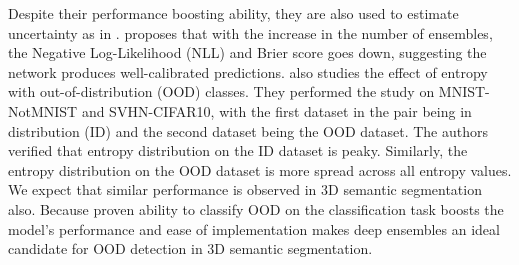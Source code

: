 Despite their performance boosting ability, they are also used to estimate uncertainty as in \cite{lakshminarayanan2016simple}.
\cite{lakshminarayanan2016simple} proposes that with the increase in the number of ensembles, the Negative Log-Likelihood (NLL) and Brier score goes down, suggesting the network produces well-calibrated predictions.
\cite{lakshminarayanan2016simple} also studies the effect of entropy with out-of-distribution (OOD) classes.
They performed the study on MNIST-NotMNIST and SVHN-CIFAR10, with the first dataset in the pair being in distribution (ID) and the second dataset being the OOD dataset.
The authors verified that entropy distribution on the ID dataset is peaky. Similarly, the entropy distribution on the OOD dataset is more spread across all entropy values.
We expect that similar performance is observed in 3D semantic segmentation also.
Because proven ability to classify OOD on the classification task boosts the model's performance and ease of implementation makes deep ensembles an ideal candidate for OOD detection in 3D semantic segmentation.

